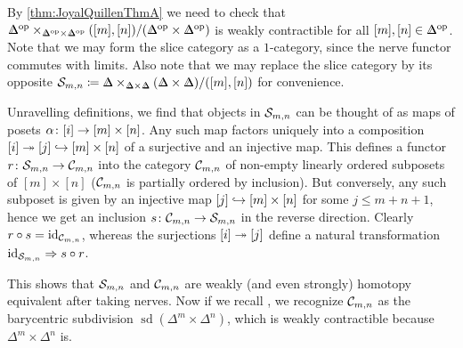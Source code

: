 \documentclass[a4paper, 10pt, oneside, DIV=9, chapterprefix=true, numbers=enddot,bibliography=totoc]{scrbook}
\begin{document}
\begin{proof*}
	By \cref{thm:JoyalQuillenThmA} we need to check that $\IDelta^\op\times_{\IDelta^\op\times \IDelta^\op}([m],[n])/(\IDelta^\op\times \IDelta^\op)$ is weakly contractible for all $[m],[n]\in \IDelta^\op$. Note that we may form the slice category as a $1$-category, since the nerve functor commutes with limits. Also note that we may replace the slice category by its opposite $\Ss_{m,n}\coloneqq\IDelta\times_{\IDelta\times \IDelta}(\IDelta\times \IDelta)/([m],[n])$ for convenience.
	
	Unravelling definitions, we find that objects in $\mathcal{S}_{m,n}$ can be thought of as maps of posets $\alpha\colon [i]\morphism {}[m]\times [n]$. Any such map factors uniquely into a composition $[i]\epimorphism{} [j]\monomorphism{} [m]\times [n]$ of a surjective and an injective map. This defines a functor $r\colon \Ss_{m,n}\morphism\Cc_{m,n}$ into the category $\mathcal{C}_{m,n}$ of non-empty linearly ordered subposets of $[m]\times [n]$ ($\mathcal{C}_{m,n}$ is partially ordered by inclusion). But conversely, any such subposet is given by an injective map $[j]\monomorphism {}[m]\times [n]$ for some $j\leq m+n+1$, hence we get an inclusion $s\colon \Cc_{m,n}\morphism \Ss_{m,n}$ in the reverse direction. Clearly $r\circ s=\operatorname{id}_{\mathcal{C}_{m,n}}$, whereas the surjections $[i]\epimorphism{} [j]$ define a natural transformation $\operatorname{id}_{\mathcal{S}_{m,n}}\Rightarrow s\circ r$.
	
	This shows that $\mathcal{S}_{m,n}$ and $\mathcal{C}_{m,n}$ are weakly (and even strongly) homotopy equivalent after taking nerves. Now if we recall \cite[Definition~V.4.7]{HigherCatsI}, we recognize $\mathcal{C}_{m,n}$ as the barycentric subdivision $\operatorname{sd}(\Delta^m\times \Delta^n)$, which is weakly contractible because $\Delta^m\times \Delta^n$ is.
\end{proof*}
\end{document}
